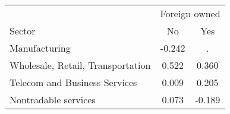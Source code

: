 \begin{tabular}{lcc}
\toprule
 & \multicolumn{2}{c}{Foreign owned} \\
\cmidrule(lr){2-3}
Sector & No & Yes \\
\midrule
Manufacturing & -0.242 & . \\
Wholesale, Retail, Transportation & 0.522 & 0.360 \\
Telecom and Business Services & 0.009 & 0.205 \\
Nontradable services & 0.073 & -0.189 \\
\bottomrule
\end{tabular}
